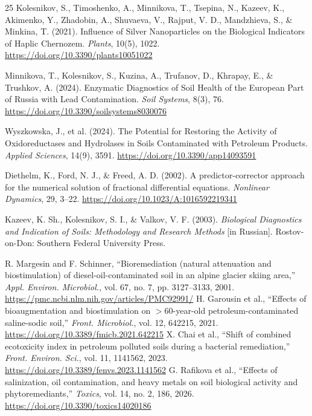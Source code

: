 \documentclass[10pt,twocolumn,a4paper]{article}
\begin{document}
\begin{thebibliography}{25}
Kolesnikov, S., Timoshenko, A., Minnikova, T., Tsepina, N., Kazeev, K., Akimenko, Y., Zhadobin, A., Shuvaeva, V., Rajput, V. D., Mandzhieva, S., \& Minkina, T. (2021). Influence of Silver Nanoparticles on the Biological Indicators of Haplic Chernozem. \textit{Plants}, 10(5), 1022. \href{https://doi.org/10.3390/plants10051022}{https://doi.org/10.3390/plants10051022}

Minnikova, T., Kolesnikov, S., Kuzina, A., Trufanov, D., Khrapay, E., \& Trushkov, A. (2024). Enzymatic Diagnostics of Soil Health of the European Part of Russia with Lead Contamination. \textit{Soil Systems}, 8(3), 76. \href{https://doi.org/10.3390/soilsystems8030076}{https://doi.org/10.3390/soilsystems8030076}

Wyszkowska, J., et al. (2024). The Potential for Restoring the Activity of Oxidoreductases and Hydrolases in Soils Contaminated with Petroleum Products. \textit{Applied Sciences}, 14(9), 3591. \href{https://doi.org/10.3390/app14093591}{https://doi.org/10.3390/app14093591}

Diethelm, K., Ford, N. J., \& Freed, A. D. (2002). A predictor-corrector approach for the numerical solution of fractional differential equations. \textit{Nonlinear Dynamics}, 29, 3--22. \href{https://doi.org/10.1023/A:1016592219341}{https://doi.org/10.1023/A:1016592219341}

Kazeev, K. Sh., Kolesnikov, S. I., \& Valkov, V. F. (2003). \textit{Biological Diagnostics and Indication of Soils: Methodology and Research Methods} [in Russian]. Rostov-on-Don: Southern Federal University Press.

 R. Margesin and F. Schinner, ``Bioremediation (natural attenuation and biostimulation) of diesel-oil-contaminated soil in an alpine glacier skiing area,'' \textit{Appl. Environ. Microbiol.}, vol. 67, no. 7, pp. 3127--3133, 2001. \url{https://pmc.ncbi.nlm.nih.gov/articles/PMC92991/}
 H. Garousin et al., ``Effects of bioaugmentation and biostimulation on $>60$-year-old petroleum-contaminated saline-sodic soil,'' \textit{Front. Microbiol.}, vol. 12, 642215, 2021. \href{https://doi.org/10.3389/fmicb.2021.642215}{https://doi.org/10.3389/fmicb.2021.642215}
 X. Chai et al., ``Shift of combined ecotoxicity index in petroleum polluted soils during a bacterial remediation,'' \textit{Front. Environ. Sci.}, vol. 11, 1141562, 2023. \href{https://doi.org/10.3389/fenvs.2023.1141562}{https://doi.org/10.3389/fenvs.2023.1141562}
 G. Rafikova et al., ``Effects of salinization, oil contamination, and heavy metals on soil biological activity and phytoremediants,'' \textit{Toxics}, vol. 14, no. 2, 186, 2026. \href{https://doi.org/10.3390/toxics14020186}{https://doi.org/10.3390/toxics14020186}


\end{thebibliography}
\end{document}
